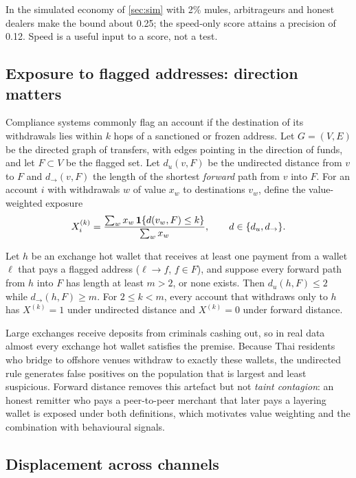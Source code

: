 In the simulated economy of \cref{sec:sim} with 2\% mules, arbitrageurs and honest dealers make the bound about 0.25;
the speed-only score attains a precision of 0.12. Speed is a useful input to a score, not a test.

\subsection{Exposure to flagged addresses: direction matters}\label{sec:direction}

Compliance systems commonly flag an account if the destination of its withdrawals lies within $k$ hops of a sanctioned
or frozen address. Let $G=(V,E)$ be the directed graph of transfers, with edges pointing in the direction of funds, and
let $F\subset V$ be the flagged set. Let $d_u(v,F)$ be the undirected distance from $v$ to $F$ and $d_\to(v,F)$ the length
of the shortest \emph{forward} path from $v$ into $F$. For an account $i$ with withdrawals $w$ of value $x_w$ to
destinations $v_w$, define the value-weighted exposure
\begin{equation}\label{eq:exposure}
X_i^{(k)}=\frac{\sum_w x_w\,\mathbf{1}\{d(v_w,F)\leq k\}}{\sum_w x_w},\qquad d\in\{d_u,d_\to\}.
\end{equation}

\begin{proposition}\label{prop:direction}
Let $h$ be an exchange hot wallet that receives at least one payment from a wallet $\ell$ that pays a flagged address
($\ell\to f$, $f\in F$), and suppose every forward path from $h$ into $F$ has length at least $m>2$, or none exists. Then
$d_u(h,F)\leq 2$ while $d_\to(h,F)\geq m$. For $2\le k<m$, every account that withdraws only to $h$ has $X^{(k)}=1$
under undirected distance and $X^{(k)}=0$ under forward distance.
\end{proposition}

Large exchanges receive deposits from criminals cashing out, so in real data almost every exchange hot wallet satisfies
the premise. Because Thai residents who bridge to offshore venues withdraw to exactly these wallets, the undirected rule
generates false positives on the population that is largest and least suspicious. Forward distance removes this
artefact but not \emph{taint contagion}: an honest remitter who pays a peer-to-peer merchant that later pays a layering
wallet is exposed under both definitions, which motivates value weighting and the combination with behavioural signals.

\subsection{Displacement across channels}\label{sec:displacement}

